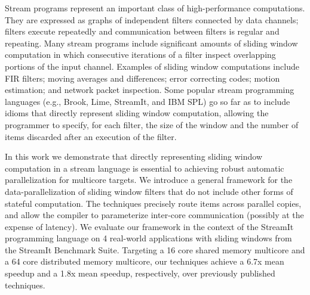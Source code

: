 Stream programs represent an important class of high-performance
computations. They are expressed as graphs of independent filters
connected by data channels; filters execute repeatedly and
communication between filters is regular and repeating.  Many stream
programs include significant amounts of sliding window computation in
which consecutive iterations of a filter inspect overlapping portions
of the input channel.  Examples of sliding window computations include
FIR filters; moving averages and differences; error correcting
codes; motion estimation; and network packet inspection.  Some popular
stream programming languages (e.g., Brook, Lime, StreamIt, and IBM
SPL) go so far as to include idioms that directly represent sliding
window computation, allowing the programmer to specify, for each
filter, the size of the window and the number of items discarded after
an execution of the filter.

In this work we demonstrate that directly representing sliding window
computation in a stream language is essential to achieving robust
automatic parallelization for multicore targets. We introduce a
general framework for the data-parallelization of sliding window
filters that do not include other forms of stateful computation.  The
techniques precisely route items across parallel copies, and allow the
compiler to parameterize inter-core communication (possibly at the
expense of latency).  We evaluate our framework in the context of the
StreamIt programming language on 4 real-world applications with
sliding windows from the StreamIt Benchmark Suite.  Targeting
a 16 core shared memory multicore and a 64 core distributed memory
multicore, our techniques achieve a 6.7x mean speedup and a 1.8x mean
speedup, respectively, over previously published techniques.
